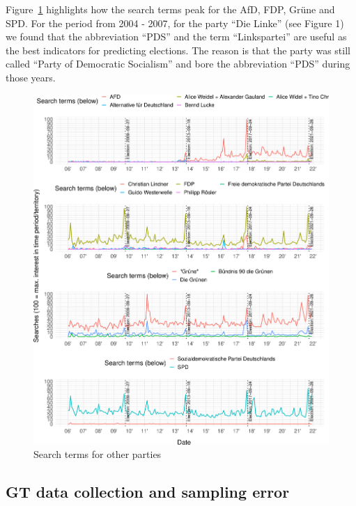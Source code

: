 \documentclass[
  letterpaper,
  DIV=11,
  numbers=noendperiod]{scrartcl}
\begin{document}
Figure~\ref{fig-A2} highlights how the search terms peak for the AfD,
FDP, Grüne and SPD. For the period from 2004 - 2007, for the party ``Die
Linke'' (see Figure 1) we found that the abbreviation ``PDS'' and the
term ``Linkspartei'' are useful as the best indicators for predicting
elections. The reason is that the party was still called ``Party of
Democratic Socialism'' and bore the abbreviation ``PDS'' during those
years.

\begin{figure}[H]

\caption{\label{fig-A2}Search terms for other parties}

{\centering \includegraphics{figures/fig-A2-1.pdf}

}

\end{figure}

\hypertarget{gt-data-collection-and-sampling-error}{%
\subsection{GT data collection and sampling
error}\label{gt-data-collection-and-sampling-error}}
\end{document}
